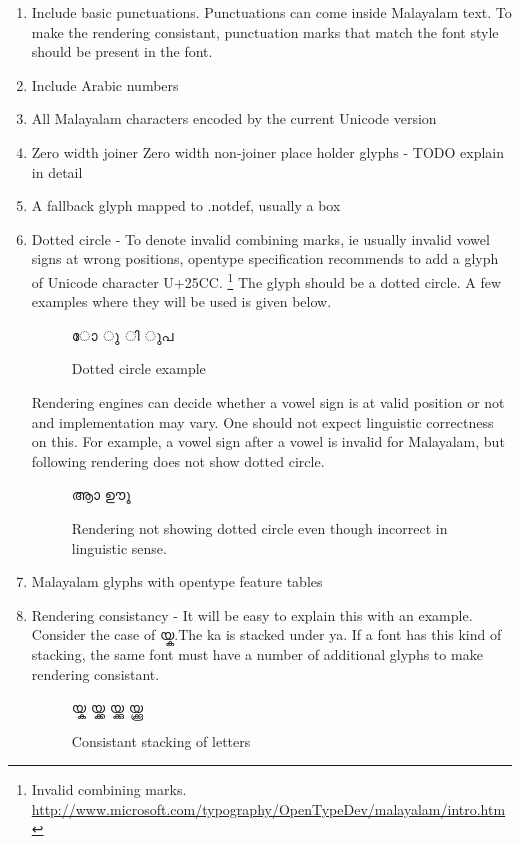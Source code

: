 \begin{enumerate}
\item Include basic punctuations. Punctuations can come inside Malayalam text.
To make the rendering consistant, punctuation marks that match the font style 
should be present in the font.
\item Include Arabic numbers
\item All Malayalam characters encoded by the current Unicode version
\item Zero width joiner Zero width non-joiner place holder glyphs - TODO 
explain in detail
\item A fallback glyph mapped to .notdef, usually a box
\item Dotted circle - To denote invalid combining marks, ie usually invalid 
vowel signs at wrong positions, opentype specification 
recommends to add a glyph of Unicode character U+25CC.
\footnote{Invalid combining marks. 
\url{http://www.microsoft.com/typography/OpenTypeDev/malayalam/intro.htm}}
The glyph should be a 
dotted circle. A few examples where they will be used is given below.
\begin{figure}[h]
  \centering
  {\meera\textexample ോ ു ി ുപ }\\
  \caption{Dotted circle example}
\end{figure}

Rendering engines can decide whether a vowel sign is at valid position or not 
and implementation may vary.
One should not expect linguistic correctness on this. For example, a vowel sign 
after a vowel is invalid for Malayalam, but following rendering does not show 
dotted circle.

\begin{figure}[h]
  \centering
  {\meera\textexample ആാ ഊൂ }\\
  \caption{Rendering not showing dotted circle even though incorrect in 
linguistic sense.}
\end{figure}

\item Malayalam glyphs with opentype feature tables
\item Rendering consistancy - It will be easy to explain this with an example. 
Consider the case of {\malayalam യ്ക}.The ka is stacked under ya. If a font has
this kind of stacking, the same font must have a number of additional glyphs to 
make rendering consistant.
\begin{figure}[h!]
  \centering
  {\meera\textexample യ്ക യ്ക്ക യ്ക്കു യ്ക്കൂ }\\
  \caption{Consistant stacking of letters}
\end{figure}


\end{enumerate}
